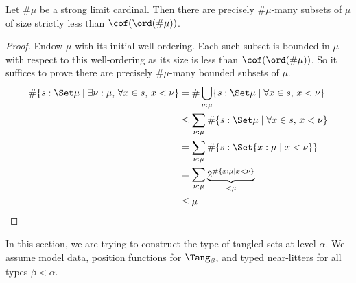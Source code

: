 \begin{lemma}[mathlib]
  \label{prop:card_subset_card_lt_cof}
  Let \( \#\mu \) be a strong limit cardinal.
  Then there are precisely \( \#\mu \)-many subsets of \( \mu \) of size strictly less than \( \cof(\ord(\#\mu)) \).
\end{lemma}
\begin{proof}
  Endow \( \mu \) with its initial well-ordering.
  Each such subset is bounded in \( \mu \) with respect to this well-ordering as its size is less than \( \cof(\ord(\#\mu)) \).
  So it suffices to prove there are precisely \( \#\mu \)-many bounded subsets of \( \mu \).
  \begin{align*}
    \#\{ s : \Set \mu \mid \exists \nu : \mu,\, \forall x \in s,\, x < \nu \}
    &= \#\bigcup_{\nu : \mu} \{ s : \Set \mu \mid \forall x \in s,\, x < \nu \} \\
    &\leq \sum_{\nu : \mu} \#\{ s : \Set \mu \mid \forall x \in s,\, x < \nu \} \\
    &= \sum_{\nu : \mu} \#\{ s : \Set \{ x : \mu \mid x < \nu \}\} \\
    &= \sum_{\nu : \mu} \underbrace{2^{\#\{ x : \mu \mid x < \nu \}}}_{<\mu} \\
    &\leq \mu
  \end{align*}
\end{proof}


In this section, we are trying to construct the type of tangled sets at level \( \alpha \).
We assume model data, position functions for \( \Tang_\beta \), and typed near-litters for all types \( \beta < \alpha \).

